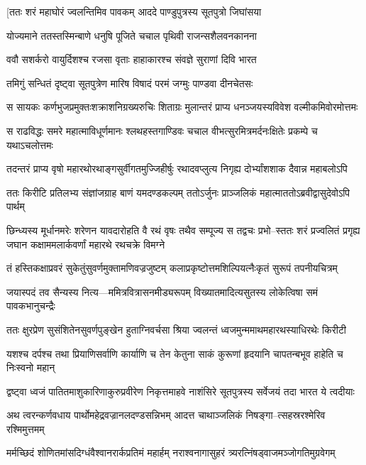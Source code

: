 \twolineshloka
{[ततः शरं महाघोरं ज्वलन्तिमिव पावकम्}
{आददे पाण्डुपुत्रस्य सूतपुत्रो जिघांसया}


\twolineshloka
{योज्यमाने ततस्तस्मिन्बाणे धनुषि पूजिते}
{चचाल पृथिवी राजन्सशैलवनकानना}


\twolineshloka
{ववौ सशर्करो वायुर्दिशश्च रजसा वृताः}
{हाहाकारश्च संवज्ञे सुराणां दिवि भारत}


\twolineshloka
{तमिगुं सन्धितं दृष्ट्वा सूतपुत्रेण मारिष}
{विषादं परमं जग्मुः पाण्डवा दीनचेतसः}


\twolineshloka
{स सायकः कर्णभुजप्रमुक्तःशक्राशनिग्रख्यरुचिः शिताग्रः}
{मुलान्तरं प्राप्य धनञ्जयस्यविवेश वल्मीकमिवोरमोत्तमः}


\twolineshloka
{स राढविद्धः समरे महात्माविधूर्णमानः श्लथहस्तगाण्डिवः}
{चचाल वीभत्सुरमित्रमर्दनःक्षितेः प्रकम्पे च यथाऽचलोत्तमः}


\twolineshloka
{तदन्तरं प्राप्य वृषो महारथोरथाङ्गसुर्वीगतमुज्जिहीर्षुः}
{रथादवप्लुत्य निगृह्य दोर्भ्यांशशाक दैवान्न महाबलोऽपि}


\twolineshloka
{ततः किरीटि प्रतिलभ्य संज्ञांजग्राह बाणं यमदण्डकल्पम्}
{ततोऽर्जुनः प्राञ्जलिकं महात्माततोऽब्रवीद्वासुदेवोऽपि पार्थम्}


\threelineshloka
{छिन्ध्यस्य मूर्धानमरेः शरेणन यावदारोहति वै रथं वृषः}
{तथैव सम्पूज्य स तद्वचः प्रभो--स्ततः शरं प्रज्वलितं प्रगृह्य}
{जघान कक्षाममलार्कवर्णां महारथे रथचक्रे विमग्ने}


\twolineshloka
{तं हस्तिकक्षाप्रवरं सुकेतुंसुवर्णमुक्तामणिवज्रजुष्टम्}
{कलाप्रकृष्टोत्तमशिल्पियत्नैःकृतं सुरूपं तपनीयचित्रम्}


\twolineshloka
{जयास्पदं तव सैन्यस्य नित्य---ममित्रवित्रासनमीड्यरूपम्}
{विख्यातमादित्यसुतस्य लोकेत्विषा समं पावकभानुचन्द्रैः}


\twolineshloka
{ततः क्षुरप्रेण सुसंशितेनसुवर्णपुङ्खेन हुताग्निवर्चसा}
{श्रिया ज्वलन्तं ध्वजमुन्ममाथमहारथस्याधिरथेः किरीटी}


\twolineshloka
{यशश्च दर्पश्च तथा प्रियाणिसर्वाणि कार्याणि च तेन केतुना}
{साकं कुरूणां हृदयानि चापतन्बभूव हाहेति च निःस्वनो महान्}


\twolineshloka
{द्वष्ट्वा ध्वजं पातितमाशुकारिणाकुरुप्रवीरेण निकृत्तमाहवे}
{नाशंसिरे सूतपुत्रस्य सर्वेजयं तदा भारत ये त्वदीयाः}


\twolineshloka
{अथ त्वरन्कर्णवधाय पार्थोमहेद्रवज्रानलदण्डसन्निभम्}
{आदत्त चाथाञ्जलिकं निषङ्गा--त्सहस्ररश्मेरिव रश्मिमुत्तमम्}


\twolineshloka
{मर्मच्छिदं शोणितमांसदिग्धंवैश्वानरार्कप्रतिमं महार्हम्}
{नराश्वनागासुहरं त्र्यरत्निंषड्वाजमञ्जोगतिमुग्रवेगम्}


